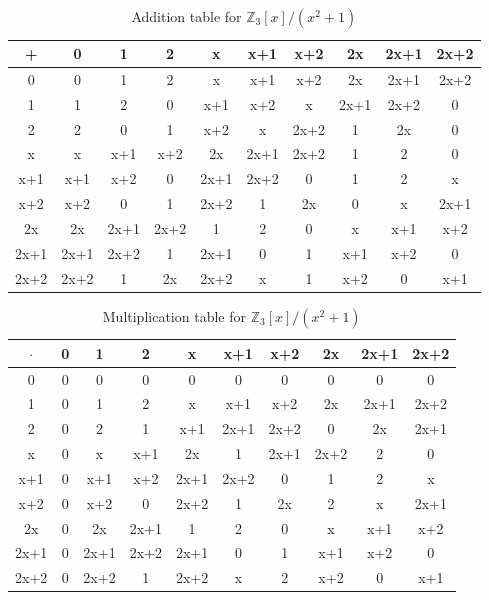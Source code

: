 \documentclass{article}
\begin{document}
\begin{table}[H]
    \centering
    \begin{tabular}{c|ccccccccc}
        + & 0 & 1 & 2 & x & x+1 & x+2 & 2x & 2x+1 & 2x+2 \\
        \hline
        0 & 0 & 1 & 2 & x & x+1 & x+2 & 2x & 2x+1 & 2x+2 \\
        1 & 1 & 2 & 0 & x+1 & x+2 & x & 2x+1 & 2x+2 & 0 \\
        2 & 2 & 0 & 1 & x+2 & x & 2x+2 & 1 & 2x & 0 \\
        x & x & x+1 & x+2 & 2x & 2x+1 & 2x+2 & 1 & 2 & 0 \\
        x+1 & x+1 & x+2 & 0 & 2x+1 & 2x+2 & 0 & 1 & 2 & x \\
        x+2 & x+2 & 0 & 1 & 2x+2 & 1 & 2x & 0 & x & 2x+1 \\
        2x & 2x & 2x+1 & 2x+2 & 1 & 2 & 0 & x & x+1 & x+2 \\
        2x+1 & 2x+1 & 2x+2 & 1 & 2x+1 & 0 & 1 & x+1 & x+2 & 0 \\
        2x+2 & 2x+2 & 1 & 2x & 2x+2 & x & 1 & x+2 & 0 & x+1 \\
    \end{tabular}
    \caption{Addition table for \(\mathbb{Z}_3[x] / (x^2+1)\)}
\end{table}

\begin{table}[H]
    \centering
    \begin{tabular}{c|ccccccccc}
        $\cdot$ & 0 & 1 & 2 & x & x+1 & x+2 & 2x & 2x+1 & 2x+2 \\
        \hline
        0 & 0 & 0 & 0 & 0 & 0 & 0 & 0 & 0 & 0 \\
        1 & 0 & 1 & 2 & x & x+1 & x+2 & 2x & 2x+1 & 2x+2 \\
        2 & 0 & 2 & 1 & x+1 & 2x+1 & 2x+2 & 0 & 2x & 2x+1 \\
        x & 0 & x & x+1 & 2x & 1 & 2x+1 & 2x+2 & 2 & 0 \\
        x+1 & 0 & x+1 & x+2 & 2x+1 & 2x+2 & 0 & 1 & 2 & x \\
        x+2 & 0 & x+2 & 0 & 2x+2 & 1 & 2x & 2 & x & 2x+1 \\
        2x & 0 & 2x & 2x+1 & 1 & 2 & 0 & x & x+1 & x+2 \\
        2x+1 & 0 & 2x+1 & 2x+2 & 2x+1 & 0 & 1 & x+1 & x+2 & 0 \\
        2x+2 & 0 & 2x+2 & 1 & 2x+2 & x & 2 & x+2 & 0 & x+1 \\
    \end{tabular}
    \caption{Multiplication table for \(\mathbb{Z}_3[x] / (x^2+1)\)}
\end{table}
\end{document}
